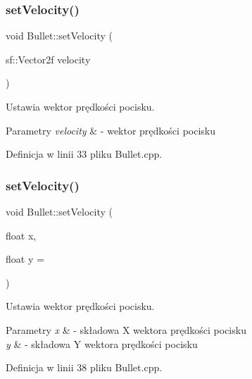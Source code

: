\subsubsection{\texorpdfstring{set\+Velocity()}{setVelocity()}\hspace{0.1cm}{\footnotesize\ttfamily [1/2]}}
{\footnotesize\ttfamily void Bullet\+::set\+Velocity (\begin{DoxyParamCaption}\item[{sf\+::\+Vector2f}]{velocity }\end{DoxyParamCaption})}



Ustawia wektor prędkości pocisku. 


\begin{DoxyParams}{Parametry}
{\em velocity} & -\/ wektor prędkości pocisku \\
\hline
\end{DoxyParams}


Definicja w linii 33 pliku Bullet.\+cpp.

\mbox{\label{class_bullet_a2bb01459022a349fb8e7bd82d0a53283}} 
\subsubsection{\texorpdfstring{set\+Velocity()}{setVelocity()}\hspace{0.1cm}{\footnotesize\ttfamily [2/2]}}
{\footnotesize\ttfamily void Bullet\+::set\+Velocity (\begin{DoxyParamCaption}\item[{float}]{x,  }\item[{float}]{y = {} }\end{DoxyParamCaption})}



Ustawia wektor prędkości pocisku. 


\begin{DoxyParams}{Parametry}
{\em x} & -\/ składowa X wektora prędkości pocisku \\
\hline
{\em y} & -\/ składowa Y wektora prędkości pocisku \\
\hline
\end{DoxyParams}


Definicja w linii 38 pliku Bullet.\+cpp.

\mbox{\label{class_bullet_a32f4a0611fe2dd245fee955d14ca1f68}} 

